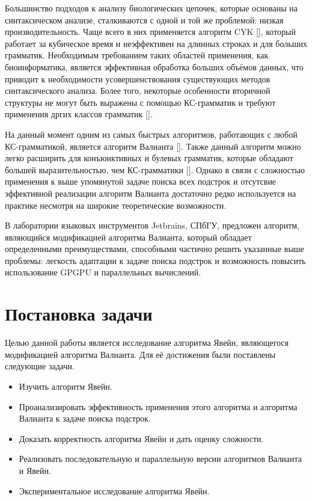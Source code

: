 \documentclass[14pt]{matmex-diploma-custom}
\begin{document}
Большинство подходов к анализу биологических цепочек, которые основаны на синтаксическом анализе, сталкиваются с одной и той же проблемой: низкая производительность. 
Чаще всего в них применяется алгоритм CYK [], который работает за кубическое время и неэффективен на длинных строках и для больших грамматик. 
Необходимым требованием таких областей применения, как биоинформатика, является эффективная обработка больших объёмов данных, что приводит к необходимости усовершенствования существующих методов синтаксического анализа.
Более того, некоторые особенности вторичной структуры не могут быть выражены с помощью КС-грамматик и требуют применения дргих классов грамматик [].

На данный момент одним из самых быстрых алгоритмов, работающих с любой КС-грамматикой, является алгоритм Валианта []. 
Также данный алгоритм можно легко расширить для конъюнктивных и булевых грамматик, которые обладают большей выразительностью, чем КС-грамматики []. 
Однако в связи с сложностью  применения к выше упомянутой задаче поиска всех подстрок и отсутсвие эффективной реализации алгоритм Валианта достаточно редко используется на практике несмотря на широкие теоретические возможности.

В лаборатории языковых инструментов Jetbrains, СПбГУ, предложен алгоритм, являющийся модификацией алгоритма Валианта, который обладает определенными преимуществами, способными частично решить указанные выше проблемы: легкость адаптации к задаче поиска подстрок и возможность повысить использование GPGPU и параллельных вычислений.



\section{Постановка задачи}

Целью данной работы является исследование алгоритма Явейн, являющегося модификацией алгоритма Валианта.
Для её достижения были поставлены следующие задачи.

\begin{itemize}
	\item Изучить алгоритм Явейн.
	\item Проанализировать эффективность применения этого алгоритма и алгоритма Валианта к задаче поиска подстрок.
	\item Доказать корректность алгоритма Явейн и дать оценку сложности.
	\item Реализовать последовательную и параллельную версии алгоритмов Валианта и Явейн.
	\item Экспериментальное исследование алгоритма Явейн.
\end{itemize}
	
\end{document}
